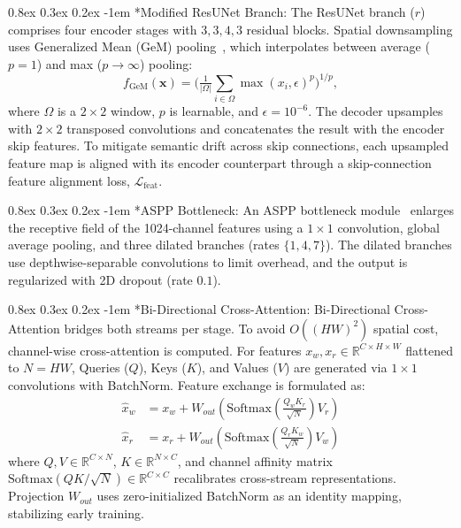 \documentclass{article}
\makeatletter
\renewcommand\paragraph{\@startsection{paragraph}{4}{0pt}%
  {0.8ex \@plus 0.3ex \@minus 0.2ex}%
  {-1em}%
  {\normalsize\bfseries}}
\makeatother
\begin{document}
\paragraph*{Modified ResUNet Branch:}
The ResUNet branch ($r$) comprises four encoder stages with $3,3,4,3$ residual
blocks. Spatial downsampling uses Generalized Mean (GeM) pooling~\cite{gem},
which interpolates between average ($p{=}1$) and max ($p{\to}\infty$) pooling:
\begin{equation}
f_{\mathrm{GeM}}(\mathbf{x}) =
\Big(\tfrac{1}{|\Omega|}\textstyle\sum_{i\in\Omega}\max(x_i,\epsilon)^{p}\Big)^{1/p},
\end{equation}
where $\Omega$ is a $2{\times}2$ window, $p$ is learnable, and $\epsilon{=}10^{-6}$.
The decoder upsamples with $2{\times}2$ transposed convolutions and concatenates
the result with the encoder skip features. To mitigate semantic drift across skip
connections, each upsampled feature map is aligned with its encoder counterpart
through a skip-connection feature alignment loss, $\mathcal{L}_{\text{feat}}$.

\paragraph*{ASPP Bottleneck:}
An ASPP bottleneck module~\cite{aspp} enlarges the receptive field of the 1024-channel features using a $1\times1$ convolution, global average pooling, and three dilated branches (rates $\{1, 4, 7\}$). The dilated branches use depthwise-separable convolutions to limit overhead, and the output is regularized with 2D dropout (rate $0.1$).

\paragraph*{Bi-Directional Cross-Attention:}
Bi-Directional Cross-Attention bridges both streams per stage. To avoid $O((HW)^2)$ spatial cost, channel-wise cross-attention is computed. For features $x_w, x_r \in \mathbb{R}^{C \times H \times W}$ flattened to $N = HW$, Queries ($Q$), Keys ($K$), and Values ($V$) are generated via $1\times1$ convolutions with BatchNorm. Feature exchange is formulated as:
\begin{align}
    \hat{x}_w &= x_w + W_{out}\left(\text{Softmax}\left(\frac{Q_w K_r}{\sqrt{N}}\right) V_r\right) \\
    \hat{x}_r &= x_r + W_{out}\left(\text{Softmax}\left(\frac{Q_r K_w}{\sqrt{N}}\right) V_w\right)
\end{align}
where $Q, V \in \mathbb{R}^{C \times N}$, $K \in \mathbb{R}^{N \times C}$, and channel affinity matrix $\text{Softmax}(QK/\sqrt{N}) \in \mathbb{R}^{C \times C}$ recalibrates cross-stream representations. Projection $W_{out}$ uses zero-initialized BatchNorm as an identity mapping, stabilizing early training.
\end{document}
